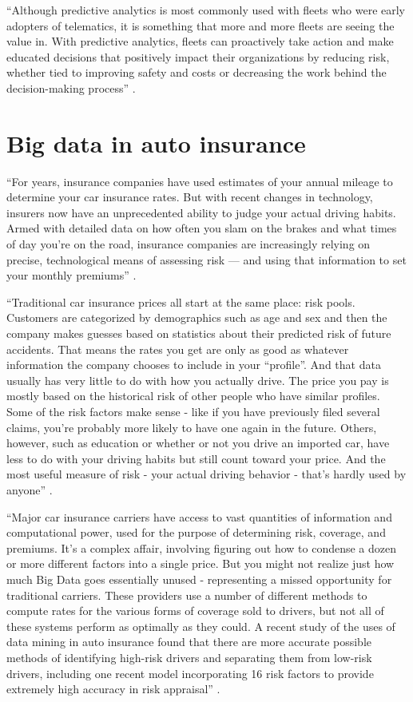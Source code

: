 ``Although predictive analytics is most commonly used with fleets who were early adopters of telematics, it is something that more and more fleets are seeing the value in. With predictive analytics, fleets can proactively take action and make educated decisions that positively impact their organizations by reducing risk, whether tied to improving safety and costs or decreasing the work behind the decision-making process'' \cite{Suizo2015decisions}.

\section{Big data in auto insurance}

``For years, insurance companies have used estimates of your annual mileage to determine your car insurance rates. But with recent changes in technology, insurers now have an unprecedented ability to judge your actual driving habits. Armed with detailed data on how often you slam on the brakes and what times of day you're on the road, insurance companies are increasingly relying on precise, technological means of assessing risk — and using that information to set your monthly premiums'' \cite{Fung2016turn}.

``Traditional car insurance prices all start at the same place: risk pools. Customers are categorized by demographics such as age and sex and then the company makes guesses based on statistics about their predicted risk of future accidents. That means the rates you get are only as good as whatever information the company chooses to include in your “profile”. And that data usually has very little to do with how you actually drive. The price you pay is mostly based on the historical risk of other people who have similar profiles. Some of the risk factors make sense - like if you have previously filed several claims, you’re probably more likely to have one again in the future. Others, however, such as education or whether or not you drive an imported car, have less to do with your driving habits but still count toward your price. And the most useful measure of risk - your actual driving behavior - that’s hardly used by anyone'' \cite{Rippe2017unfair}.

``Major car insurance carriers have access to vast quantities of information and computational power, used for the purpose of determining risk, coverage, and premiums. It’s a complex affair, involving figuring out how to condense a dozen or more different factors into a single price. But you might not realize just how much Big Data goes essentially unused - representing a missed opportunity for traditional carriers. These providers use a number of different methods to compute rates for the various forms of coverage sold to drivers, but not all of these systems perform as optimally as they could. A recent study of the uses of data mining in auto insurance found that there are more accurate possible methods of identifying high-risk drivers and separating them from low-risk drivers, including one recent model incorporating 16 risk factors to provide extremely high accuracy in risk appraisal'' \cite{Rippe2017unfair}.

